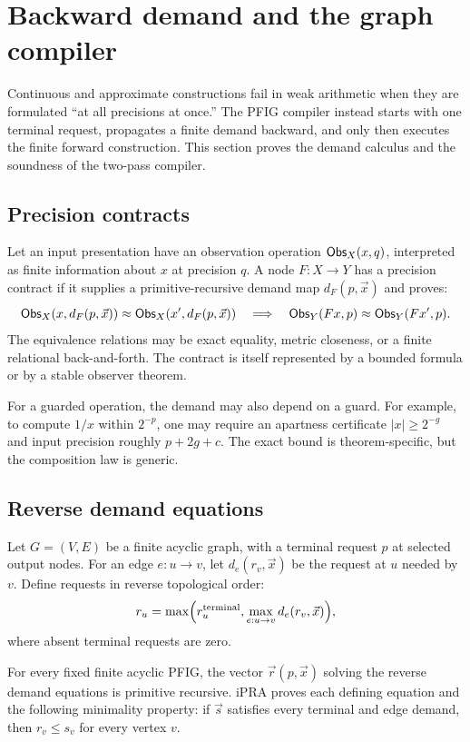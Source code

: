 \section{Backward demand and the graph compiler}
\label{sec:demand}

Continuous and approximate constructions fail in weak arithmetic when they are formulated ``at all precisions at once.''  The PFIG compiler instead starts with one terminal request, propagates a finite demand backward, and only then executes the finite forward construction.  This section proves the demand calculus and the soundness of the two-pass compiler.

\subsection{Precision contracts}

Let an input presentation have an observation operation \(\mathsf{Obs}_X(x,q)\), interpreted as finite information about \(x\) at precision \(q\).  A node \(F:X\to Y\) has a precision contract if it supplies a primitive-recursive demand map \(d_F(p,\vec{x})\) and proves:
\[
 \mathsf{Obs}_X(x,d_F(p,\vec{x}))\approx
 \mathsf{Obs}_X(x',d_F(p,\vec{x}))
 \quad\Longrightarrow\quad
 \mathsf{Obs}_Y(Fx,p)\approx \mathsf{Obs}_Y(Fx',p).
\]
The equivalence relations may be exact equality, metric closeness, or a finite relational back-and-forth.  The contract is itself represented by a bounded formula or by a stable observer theorem.

For a guarded operation, the demand may also depend on a guard.  For example, to compute \(1/x\) within \(2^{-p}\), one may require an apartness certificate \(|x|\ge 2^{-g}\) and input precision roughly \(p+2g+c\).  The exact bound is theorem-specific, but the composition law is generic.

\subsection{Reverse demand equations}

Let \(G=(V,E)\) be a finite acyclic graph, with a terminal request \(p\) at selected output nodes.  For an edge \(e:u\to v\), let \(d_e(r_v,\vec{x})\) be the request at \(u\) needed by \(v\).  Define requests in reverse topological order:
\[
 r_u=
 \max\Bigl(r_u^{\mathrm{terminal}},
       \max_{e:u\to v} d_e(r_v,\vec{x})\Bigr),
\]
where absent terminal requests are zero.

\begin{theorem}
\label{thm:backward-demand}
For every fixed finite acyclic PFIG, the vector \(\vec r(p,\vec{x})\) solving the reverse demand equations is primitive recursive.  iPRA proves each defining equation and the following minimality property: if \(\vec s\) satisfies every terminal and edge demand, then \(r_v\le s_v\) for every vertex \(v\).
\end{theorem}

